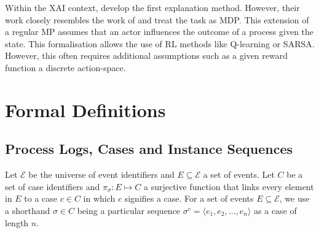 \documentclass[12pt,a4paper]{report}
\begin{document}
Within the \gls{XAI} context, \citeauthor{tsirtsis_CounterfactualExplanationsSequential_2021} develop the first explanation method. However, their work closely resembles the work of \citeauthor{oberst_CounterfactualOffPolicyEvaluation_2019} and treat the task as \gls{MDP}. This extension of a regular \gls{MP} assumes that an actor influences the outcome of a process given the state. This formalisation allows the use of \gls{RL} methods like Q-learning or SARSA\needscite. However, this often requires additional assumptions such as a given reward function a discrete action-space. 






\section{Formal Definitions}

\subsection{Process Logs, Cases and Instance Sequences}


Let $\mathcal{E}$ be the universe of event identifiers and $E \subseteq \mathcal{E}$ a set of events. Let $C$ be a set of case identifiers and $\pi_\sigma : E \mapsto C$ a surjective function that links every element in $E$ to a case $c \in C$ in which $c$ signifies a case. For a set of events $E \subseteq \mathcal{E}$, we use a shorthand $\sigma \in C$ being a particular sequence $\sigma^{c} = \langle e_1, e_2, \ldots, e_n \rangle$ as a case of length $n$. 
\end{document}
